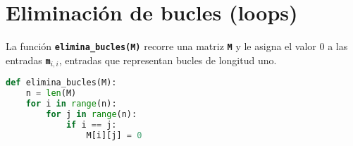 \section{Eliminación de bucles (loops)}
La función \texttt{\textbf{elimina\_bucles(M)}} recorre una matriz \texttt{\textbf{M}} y le asigna el valor $0$ a las entradas \texttt{\textbf{m$_{i,i}$}}, entradas que representan bucles de longitud uno.
\begin{lstlisting}[language=python, caption=Función elimina\_bucles(M)]
def elimina_bucles(M):
    n = len(M)
    for i in range(n):
        for j in range(n):
            if i == j:
                M[i][j] = 0
\end{lstlisting}